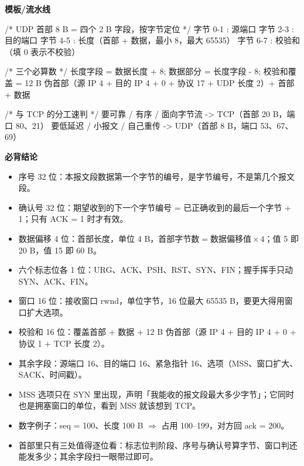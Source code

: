 \documentclass[10pt,a4paper]{ctexart}
\begin{document}
\textbf{模板/流水线}

\begin{codebox}
/* UDP 首部 8 B = 四个 2 B 字段，按字节定位 */
字节 0-1 : 源端口
字节 2-3 : 目的端口
字节 4-5 : 长度（首部 + 数据，最小 8，最大 65535）
字节 6-7 : 校验和（填 0 表示不校验）

/* 三个必算数 */
长度字段 = 数据长度 + 8;
数据部分 = 长度字段 - 8;
校验和覆盖 = 12 B 伪首部（源 IP 4 + 目的 IP 4 + 0 + 协议 17 + UDP 长度 2）+ 首部 + 数据

/* 与 TCP 的分工速判 */
要可靠 / 有序 / 面向字节流  -> TCP（首部 20 B，端口 80、21）
要低延迟 / 小报文 / 自己重传 -> UDP（首部 8 B，端口 53、67、69）
\end{codebox}




\textbf{必背结论}

\begin{itemize}

\item 序号 32 位：本报文段数据第一个字节的编号，是字节编号，不是第几个报文段。

\item 确认号 32 位：期望收到的下一个字节编号 = 已正确收到的最后一个字节 + 1；只有 ACK = 1 时才有效。

\item 数据偏移 4 位：首部长度，单位 4 B，$首部字节数=数据偏移值\times 4$；值 5 即 20 B，值 15 即 60 B。

\item 六个标志位各 1 位：URG、ACK、PSH、RST、SYN、FIN；握手挥手只动 SYN、ACK、FIN。

\item 窗口 16 位：接收窗口 rwnd，单位字节，16 位最大 65535 B，要更大得用窗口扩大选项。

\item 校验和 16 位：覆盖首部 + 数据 + 12 B 伪首部（源 IP 4 + 目的 IP 4 + 0 + 协议 1 + TCP 长度 2）。

\item 其余字段：源端口 16、目的端口 16、紧急指针 16、选项（MSS、窗口扩大、SACK、时间戳）。

\item MSS 选项只在 SYN 里出现，声明「我能收的报文段最大多少字节」；它同时也是拥塞窗口的单位，看到 MSS 就该想到 TCP。

\item 数字例子：seq = 100、长度 100 B $\Rightarrow$ 占用 100–199，对方回 ack = 200。

\item 首部里只有三处值得逐位看：标志位判阶段、序号与确认号算字节、窗口判还能发多少；其余字段扫一眼带过即可。

\end{itemize}
\end{document}
